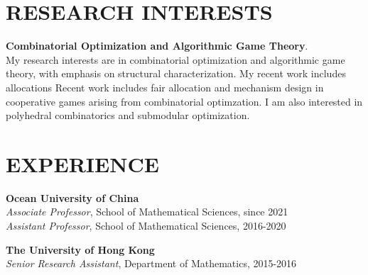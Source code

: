 \documentclass[margin]{res}
\begin{document}


\address{}


\begin{resume}

\section{RESEARCH INTERESTS}
\textbf{Combinatorial Optimization and Algorithmic Game Theory}. \\
My research interests are in combinatorial optimization and algorithmic game theory, with emphasis on structural characterization.
My recent work includes allocations 
Recent work includes fair allocation and mechanism design in cooperative games arising from combinatorial optimzation. I am also interested in polyhedral combinatorics and submodular optimization.

\section{EXPERIENCE}
\textbf{Ocean University of China}\\
{\sl Associate Professor}, School of Mathematical Sciences, since 2021
\\
{\sl Assistant Professor}, School of Mathematical Sciences, 2016-2020

\textbf{The University of Hong Kong}\\
{\sl Senior Research Assistant}, Department of Mathematics, 2015-2016


\end{resume}
\end{document}
